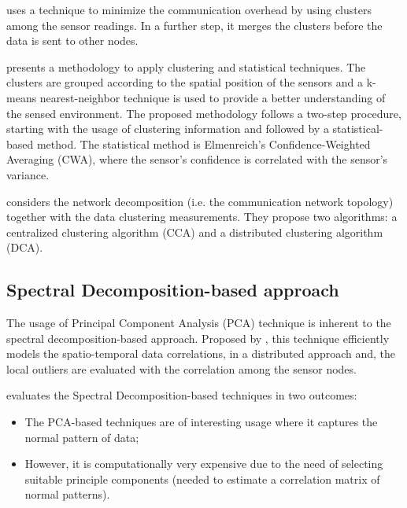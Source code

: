 \cite{clust:rajasegarar:2006} uses a technique to minimize the communication overhead by using clusters among the sensor readings. In a further step, it merges the clusters before the data is sent to other nodes.

\cite{cluster:andrade2016} presents a methodology to apply clustering and statistical techniques. The clusters are grouped according to the spatial position of the sensors and a k-means nearest-neighbor technique is used to provide a better understanding of the sensed environment. The proposed methodology follows a two-step procedure, starting with the usage of clustering information and followed by a statistical-based method. The statistical method is Elmenreich's Confidence-Weighted Averaging (CWA), where the sensor's confidence is correlated with the sensor's variance.

\cite{clust:cenedese2017} considers the network decomposition (i.e. the communication network topology) together with the data clustering measurements. They propose two algorithms: a centralized clustering algorithm (CCA) and a distributed clustering algorithm (DCA).

\subsection{Spectral Decomposition-based approach}
\label{sec:specbased}

The usage of Principal Component Analysis (PCA) technique is inherent to the spectral decomposition-based approach. Proposed by \cite{spect:chatzigiannakis:2006}, this technique efficiently models the spatio-temporal data correlations, in a distributed approach and, the local outliers are evaluated with the correlation among the sensor nodes.


\cite{gen:zhang:2010} evaluates the Spectral Decomposition-based techniques in two outcomes: 
\begin{itemize}
	
	\setlength\itemsep{-0.5em}
	
	\item The PCA-based techniques are of interesting usage where it captures the normal pattern of data;
	\item However, it is computationally very expensive due to the need of selecting suitable principle components (needed to estimate a correlation matrix of normal patterns).
	
\end{itemize}

